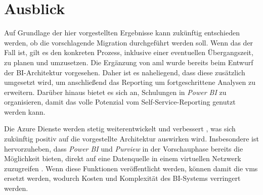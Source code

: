 \section{Ausblick}
Auf Grundlage der hier vorgestellten Ergebnisse kann zukünftig entschieden werden, ob die vorschlagende Migration durchgeführt werden soll. Wenn das der Fall ist, gilt es den konkreten Prozess, inklusive einer eventuellen Übergangszeit, zu planen und umzusetzen. Die Ergänzung von \ac{aml} wurde bereits beim Entwurf der BI-Architektur vorgesehen. Daher ist es naheliegend, dass diese zusätzlich umgesetzt wird, um anschließend das Reporting um fortgeschrittene Analysen zu erweitern. Darüber hinaus bietet es sich an, Schulungen in \textit{Power BI} zu organisieren, damit das volle Potenzial vom Self-Service-Reporting genutzt werden kann.

Die Azure Dienste werden stetig weiterentwickelt und verbessert \cite{chilberto_building_2020}, was sich zukünftig positiv auf die vorgestellte Architektur auswirken wird. Insbesondere ist hervorzuheben, dass \textit{Power BI} und \textit{Purview} in der Vorschauphase bereits die Möglichkeit bieten, direkt auf eine Datenquelle in einem virtuellen Netzwerk zuzugreifen \cite{msdoc_22_purview_manPE, msdoc_22_pbi_vnetGateway}. Wenn diese Funktionen veröffentlicht werden, können damit die \acp{vm} ersetzt werden, wodurch Kosten und Komplexität des BI-Systems verringert werden.